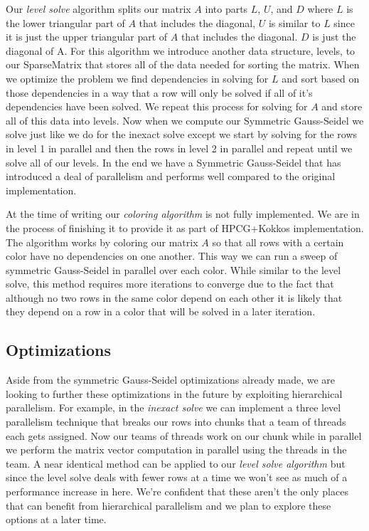 \documentclass{ccr15}
\begin{document}
Our \emph{level solve} algorithm splits our matrix $A$ into parts $L$, $U$, and $D$ where $L$ is the
lower triangular part of $A$ that includes the diagonal, $U$ is similar to $L$ since it is just
the upper triangular part of $A$ that includes the diagonal. $D$ is just the diagonal of A. For
this algorithm we introduce another data structure, levels, to our SparseMatrix that stores all 
of the data needed for sorting the matrix. When we optimize the problem we find dependencies in
solving for $L$ and sort based on those dependencies in a way that a row will only be solved if
all of it's dependencies have been solved. We repeat this process for solving for $A$ and store
all of this data into levels. Now when we compute our Symmetric Gauss-Seidel we solve just like
we do for the inexact solve except we start by solving for the rows in level 1 in parallel and
then the rows in level 2 in parallel and repeat until we solve all of our levels. In the end we
have a Symmetric Gauss-Seidel that has introduced a deal of parallelism and performs well
compared to the original implementation.

At the time of writing our \emph{coloring algorithm} is not fully implemented. We are in the process of finishing it to provide it as part of HPCG+Kokkos
implementation.
The algorithm works by coloring our matrix $A$ so that all rows
with a certain color have no dependencies on one another. This way we can run a sweep of symmetric
Gauss-Seidel in parallel over each color. While similar to the level solve, this method requires more iterations
to converge due to the fact that although no two rows in the same color depend on each other it is likely
that they depend on a row in a color that will be solved in a later iteration.

\subsection{Optimizations}
Aside from the symmetric Gauss-Seidel optimizations already made, we are looking to further these
optimizations in the future by exploiting hierarchical parallelism. For example, in the \emph{inexact
solve} we can implement a three level parallelism technique that breaks our rows into chunks that 
a team of threads each gets assigned. Now our teams of threads work on our chunk while in
parallel we perform the matrix vector computation in parallel using the threads in the team. A
near identical method can be applied to our \emph{level solve algorithm} but since the level solve deals
with fewer rows at a time we won't see as much of a performance increase in here. We're confident
that these aren't the only places that can benefit from hierarchical parallelism and we plan to
explore these options at a later time.
\end{document}
